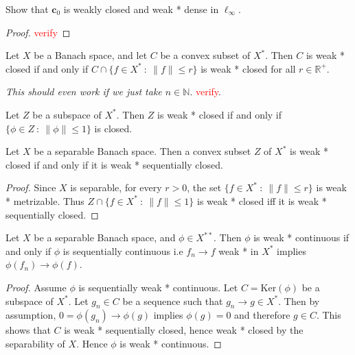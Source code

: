\begin{proposition}
  Show that $\textbf{c}_{0}$ is weakly closed and weak * dense in $\ell_\infty$.
\end{proposition}
\begin{proof}
  \textcolor{red}{verify}
\end{proof}

\begin{theorem}
  Let $X$ be a Banach space, and let $C$ be a convex subset of $X^*$.
  Then $C$ is weak * closed if and only if $C \cap \{ f \in X^*  \ :
  \  \|f\| \le r \}$ is weak * closed for all $r \in \mathbb{R}^+$.

  \textit{This should even work if we just take $n \in \mathbb{N}$}.
  \textcolor{red}{verify}.
\end{theorem}

\begin{corollary}
  Let $Z$ be a subspace of $X^*$. Then $Z$ is weak * closed if and
  only if $\{ \phi \in Z  \ : \  \|\phi\| \le 1 \}$ is closed.
\end{corollary}

\begin{corollary}
  Let $X$ be a separable Banach space. Then a convex subset $Z$ of
  $X^*$ is weak * closed if and only if it is weak * sequentially closed.
\end{corollary}
\begin{proof}
  Since $X$ is separable, for every $r > 0$, the set $ \{ f \in X^*
  \ : \  \|f\| \le r \}$ is weak * metrizable. Thus $Z \cap \{ f \in
  X^*  \ : \  \|f\| \le 1 \}$ is weak * closed iff it is weak *
  sequentially closed.
\end{proof}

\begin{corollary}
  Let $X$ be a separable Banach space, and $\phi \in X^{**}$. Then
  $\phi$ is weak * continuous if and only if $\phi$ is sequentially
  continuous i.e $f_n \to f$ weak * in $X^*$ implies $\phi(f_n) \to \phi(f)$.
\end{corollary}
\begin{proof}
  Assume $\phi$ is sequentially weak * continuous. Let $C =
  \textrm{Ker}(\phi)$ be a subspace of $X^*$. Let $g_n \in C$ be a
  sequence such that $g_n \to g \in X^*$. Then by assumption, $0 =
  \phi(g_n) \to \phi(g)$ implies $\phi(g) = 0$ and therefore $g \in
  C$. This shows  that $ C$ is weak * sequentially closed, hence weak
  * closed by the separability of $X$. Hence $\phi$ is weak * continuous.
\end{proof}


